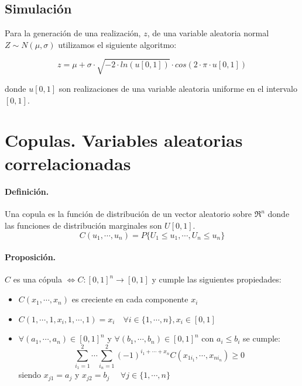 \subsection{Simulaci\'on}

Para la generaci\'on de una realizaci\'on, $z$, de una variable aleatoria normal  
$Z \sim N(\mu, \sigma)$ utilizamos el siguiente algoritmo:

\begin{displaymath}
z = \mu + \sigma\cdot \sqrt{-2 \cdot ln(u[0,1])} \cdot cos(2 \cdot \pi \cdot u[0,1])
\end{displaymath}

\noindent donde $u[0,1]$ son realizaciones de una variable aleatoria uniforme 
en el intervalo $[0,1]$.


\section{Copulas. Variables aleatorias correlacionadas}

\paragraph{Definici\'on.}
Una copula es la funci\'on de distribuci\'on de un vector aleatorio sobre 
$\Re^n$ donde las funciones de distribuci\'on marginales son $U[0,1]$. 
\begin{displaymath}
C(u_1, \cdots, u_n) = P\{U_1 \leq u_1, \cdots, U_n \leq u_n\}
\end{displaymath}

\paragraph{Proposici\'on.}
$C$ es una c\'opula $\iff C:[0,1]^n \to [0,1]$ y cumple las siguientes 
propiedades:
\begin{itemize}
\item $C(x_1, \cdots, x_n)$ es creciente en cada componente $x_i$
\item $C(1, \cdots, 1, x_i, 1, \cdots, 1) = x_i \quad \forall i \in \{1, \cdots, n\}, x_i \in [0,1]$
\item $\forall (a_1, \cdots, a_n) \in [0,1]^n$ y $\forall (b_1, \cdots, b_n) \in [0,1]^n$ con
$a_i \leq b_i$ se cumple:
\begin{displaymath}
\sum_{i_1=1}^{2} \cdots \sum_{i_n=1}^{2} (-1)^{i_1+\cdots+x_n} C(x_{1i_1},\cdots,x_{ni_n}) \geq 0
\end{displaymath}
\noindent siendo $x_{j1}=a_j$ y $x_{j2}=b_j$ $\quad \forall j \in \{1, \cdots, n\}$
\end{itemize}

